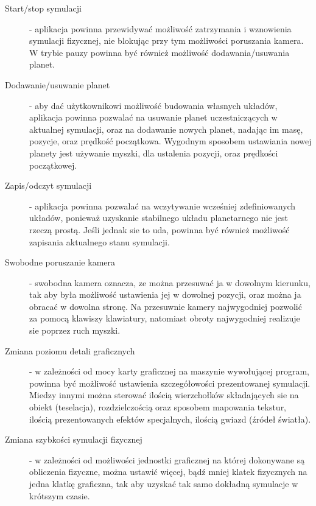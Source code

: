 \begin{description}
	\item[Start/stop symulacji] - aplikacja powinna przewidywać możliwość zatrzymania i wznowienia symulacji fizycznej, nie blokując przy tym możliwości poruszania kamera. W trybie pauzy powinna być również możliwość dodawania/usuwania planet.
	\item[Dodawanie/usuwanie planet] - aby dać użytkownikowi możliwość budowania własnych układów, aplikacja powinna pozwalać na usuwanie planet uczestniczących w aktualnej symulacji, oraz na dodawanie nowych planet, nadając im masę, pozycje, oraz prędkość początkowa. Wygodnym sposobem ustawiania nowej planety jest używanie myszki, dla ustalenia pozycji, oraz prędkości początkowej.
	\item[Zapis/odczyt symulacji] - aplikacja powinna pozwalać na wczytywanie wcześniej zdefiniowanych układów, ponieważ uzyskanie stabilnego układu planetarnego nie jest rzeczą prostą. Jeśli jednak sie to uda, powinna być również możliwość zapisania aktualnego stanu symulacji.
	\item[Swobodne poruszanie kamera] - swobodna kamera oznacza, ze można przesuwać ja w dowolnym kierunku, tak aby była możliwość ustawienia jej w dowolnej pozycji, oraz można ja obracać w dowolna stronę. Na przesuwnie kamery najwygodniej pozwolić za pomocą klawiszy klawiatury, natomiast obroty najwygodniej realizuje sie poprzez ruch myszki.
	\item[Zmiana poziomu detali graficznych] - w zależności od mocy karty graficznej na maszynie wywołującej program, powinna być możliwość ustawienia szczegółowości prezentowanej symulacji. Miedzy innymi można sterować ilością wierzchołków składających sie na obiekt (teselacja), rozdzielczością oraz sposobem mapowania tekstur, ilością prezentowanych efektów specjalnych, ilością gwiazd (źródeł światła).
	\item[Zmiana szybkości symulacji fizycznej] - w zależności od możliwości jednostki graficznej na której dokonywane są obliczenia fizyczne, można ustawić więcej, bądź mniej klatek fizycznych na jedna klatkę graficzna, tak aby uzyskać tak samo dokładną symulacje w krótszym czasie.
\end{description}

